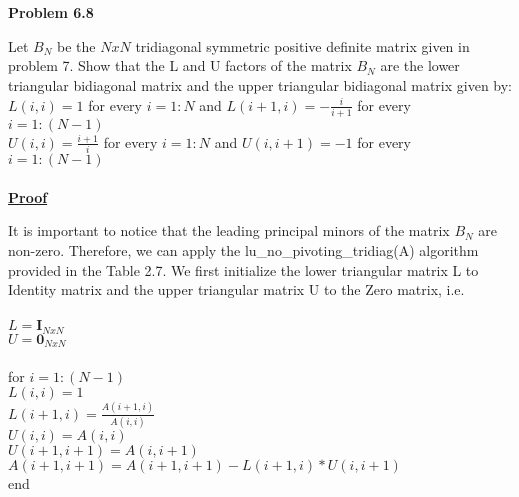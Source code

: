 \documentclass{article}
\begin{document}
\newpage{}
\section{}
\textbf {Problem 6.8} \\
\par Let \(B_N\) be the \(NxN\) tridiagonal symmetric positive definite matrix given in problem 7. Show that the L and U factors of the matrix  \(B_N\) are the lower triangular bidiagonal matrix and the upper triangular bidiagonal matrix given by:\\
\indent \(L(i,i) = 1\) for every \(i=1:N\) and \(L(i+1,i) = -\frac{i}{i+1}\) for every \(i=1:(N-1)\)\\ 
\indent\(U(i,i) = \frac{i+1}{i}\) for every \(i=1:N\) and \(U(i,i+1) = -1\) for every \(i=1:(N-1)\)\\\\
\underline{\textbf {Proof}} 
\par It is important to notice that the leading principal minors of the matrix \(B_N\) are non-zero. Therefore, we can apply the lu\_no\_pivoting\_tridiag(A) algorithm provided in the Table 2.7. We first initialize the lower triangular matrix L to Identity matrix and the upper triangular matrix U to the Zero matrix, i.e.\\\\
\indent \hspace{5 cm} \(L=\textbf{I}_{NxN}\)\\
\indent \hspace{5 cm} \(U=\textbf{0}_{NxN}\)\\\\
\indent \hspace{5 cm}for \(i=1:(N-1)\)\\
\indent \hspace{5 cm} \indent \(L(i,i) = 1\)\\
\indent \hspace{5 cm} \indent \(L(i+1,i) = \frac{A(i+1,i)}{A(i,i)}\)\\
\indent \hspace{5 cm} \indent \(U(i,i) = A(i,i)\)\\
\indent \hspace{5 cm} \indent \(U(i+1,i+1) = A(i,i+1)\)\\
\indent \hspace{5 cm} \indent \(A(i+1,i+1) = A(i+1,i+1)-L(i+1,i)*U(i,i+1)\)\\
\indent \hspace{5 cm} end\\
\end{document}
